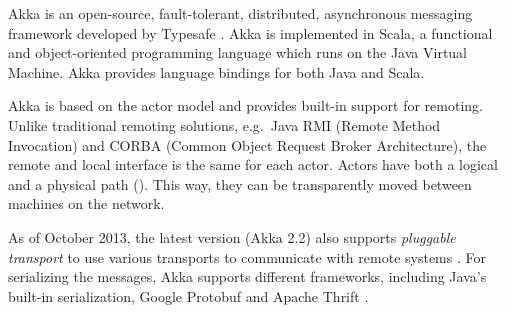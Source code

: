 Akka is an open-source, fault-tolerant, distributed, asynchronous messaging framework developed by Typesafe \cite{Akka}.
Akka is implemented in Scala, a functional and object-oriented programming language which runs on the Java Virtual Machine. Akka provides language bindings for both Java and Scala.


Akka is based on the actor model \cite{Hewitt:1973:UMA:1624775.1624804} and provides built-in support for remoting. Unlike traditional remoting solutions, e.g.\ Java RMI (Remote Method Invocation) and CORBA (Common Object Request Broker Architecture), the remote and local interface is the same for each actor. Actors have both a logical and a physical path (). This way, they can be transparently moved between machines on the network.

As of October 2013, the latest version (Akka 2.2) also supports \textit{pluggable transport} to use various transports to communicate with remote systems \cite{Akka}. For serializing the messages, Akka supports different frameworks, including Java's built-in serialization, Google Protobuf \cite{Protobuf} and Apache Thrift \cite{Thrift}.




% 
% 


